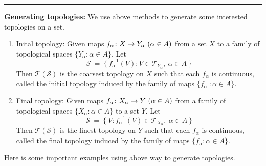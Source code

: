 \documentclass[a4paper,11pt]{report}
\begin{document}
\rule{1mm}{1mm} \textbf{Generating topologies:} We use above methods to generate some interested topologies on a set.
\begin{enumerate}[label=\arabic*)]
	\item Inital topology: Given maps $f_\alpha \colon X \rightarrow Y_\alpha ~( \alpha \in A )$ from a set $X$ to a family of topological spaces $\{Y_\alpha \colon \alpha \in A \}$. Let
	\begin{equation*}
		\mathscr{S}~=~\{~f_{\alpha}^{-1}(V) \colon V \in \mathscr{T}_{Y_\alpha},~ \alpha \in A ~\}
	\end{equation*}
	Then $\mathscr{T}(\mathscr{S})$ is the coarsest topology on $X$ such that each $f_\alpha$ is continuous, called the initial topology induced by the family of maps $\{ f_\alpha\ \colon \alpha \in  A \}$.

	\item Final topology: Given maps $f_\alpha \colon X_\alpha \rightarrow Y ~ (\alpha \in A)$ from a family of topological spaces $\{X_\alpha \colon \alpha \in A\}$ to a set $Y$. Let
	\begin{equation*}
		\mathscr{S}~=~\{~ V \colon f_{\alpha}^{-1}(V) \in \mathscr{T}_{X_\alpha},~ \alpha \in A~\}
	\end{equation*}
	Then $\mathscr{T}(\mathscr{S})$ is the finest topology on $Y$ such that each $f_\alpha$ is continuous, called the final topology induced by the family of maps $\{f_\alpha \colon \alpha \in A \}$.
\end{enumerate}
Here is some important examples using above way to generate topologies.
\end{document}
